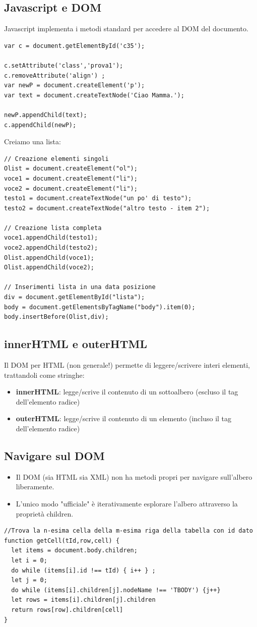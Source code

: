 \documentclass[a4paper,12pt]{article}
\begin{document}
\subsection*{Javascript e DOM}
Javascript implementa i metodi standard per accedere al DOM del documento.
\begin{lstlisting}
var c = document.getElementById('c35');

c.setAttribute('class','prova1');
c.removeAttribute('align') ;
var newP = document.createElement('p');
var text = document.createTextNode('Ciao Mamma.');

newP.appendChild(text);
c.appendChild(newP);
\end{lstlisting}
Creiamo una lista:
\begin{lstlisting}
// Creazione elementi singoli
Olist = document.createElement("ol");
voce1 = document.createElement("li");
voce2 = document.createElement("li");
testo1 = document.createTextNode("un po' di testo");
testo2 = document.createTextNode("altro testo - item 2");

// Creazione lista completa
voce1.appendChild(testo1);
voce2.appendChild(testo2);
Olist.appendChild(voce1);
Olist.appendChild(voce2);

// Inserimenti lista in una data posizione
div = document.getElementById("lista");
body = document.getElementsByTagName("body").item(0);
body.insertBefore(Olist,div);
\end{lstlisting}
\subsection*{innerHTML e outerHTML}
Il DOM per HTML (non generale!) permette di leggere/scrivere interi elementi, trattandoli come stringhe:
\begin{itemize}
  \item \textbf{innerHTML}: legge/scrive il contenuto di un sottoalbero (escluso il tag dell’elemento radice)
  \item \textbf{outerHTML}: legge/scrive il contenuto di un elemento (incluso il tag dell’elemento radice)
\end{itemize}
\subsection{Navigare sul DOM}
\begin{itemize}
  \item Il DOM (sia HTML sia XML) non ha metodi propri per navigare sull'albero liberamente.
  \item L'unico modo "ufficiale" è iterativamente esplorare l'albero attraverso la proprietà children.
\end{itemize}
\begin{lstlisting}
//Trova la n-esima cella della m-esima riga della tabella con id dato
function getCell(tId,row,cell) {
  let items = document.body.children;
  let i = 0;
  do while (items[i].id !== tId) { i++ } ;
  let j = 0;
  do while (items[i].children[j].nodeName !== 'TBODY') {j++}
  let rows = items[i].children[j].children
  return rows[row].children[cell]
}
\end{lstlisting}
\end{document}
